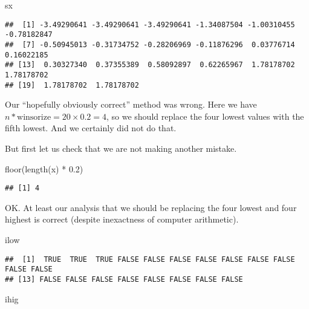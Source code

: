 \documentclass[
]{article}
\newenvironment{Shaded}{\begin{snugshade}}{\end{snugshade}}
\newcommand{\FloatTok}[1]{\textcolor[rgb]{0.00,0.00,0.81}{#1}}
\newcommand{\FunctionTok}[1]{\textcolor[rgb]{0.00,0.00,0.00}{#1}}
\newcommand{\NormalTok}[1]{#1}
\newcommand{\SpecialCharTok}[1]{\textcolor[rgb]{0.00,0.00,0.00}{#1}}
\begin{document}
\begin{Shaded}
\begin{Highlighting}[]
\NormalTok{sx}
\end{Highlighting}
\end{Shaded}

\begin{verbatim}
##  [1] -3.49290641 -3.49290641 -3.49290641 -1.34087504 -1.00310455 -0.78182847
##  [7] -0.50945013 -0.31734752 -0.28206969 -0.11876296  0.03776714  0.16022185
## [13]  0.30327340  0.37355389  0.58092897  0.62265967  1.78178702  1.78178702
## [19]  1.78178702  1.78178702
\end{verbatim}

Our ``hopefully obviously correct'' method was wrong. Here we have
\(n * \text{winsorize} = 20 \times 0.2 = 4\), so we should replace the
four lowest values with the fifth lowest. And we certainly did not do
that.

But first let us check that we are not making another mistake.

\begin{Shaded}
\begin{Highlighting}[]
\FunctionTok{floor}\NormalTok{(}\FunctionTok{length}\NormalTok{(x) }\SpecialCharTok{*} \FloatTok{0.2}\NormalTok{)}
\end{Highlighting}
\end{Shaded}

\begin{verbatim}
## [1] 4
\end{verbatim}

OK. At least our analysis that we should be replacing the four lowest
and four highest is correct (despite inexactness of computer
arithmetic).

\begin{Shaded}
\begin{Highlighting}[]
\NormalTok{ilow}
\end{Highlighting}
\end{Shaded}

\begin{verbatim}
##  [1]  TRUE  TRUE  TRUE FALSE FALSE FALSE FALSE FALSE FALSE FALSE FALSE FALSE
## [13] FALSE FALSE FALSE FALSE FALSE FALSE FALSE FALSE
\end{verbatim}

\begin{Shaded}
\begin{Highlighting}[]
\NormalTok{ihig}
\end{Highlighting}
\end{Shaded}
\end{document}
